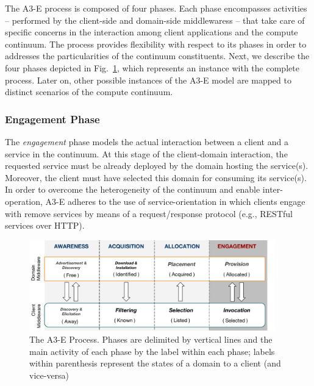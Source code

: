 The A3-E process is composed of four phases. Each phase encompasses activities -- performed by the client-side and domain-side middlewaress -- that take care of specific concerns in the interaction among client applications and the compute continuum. The process provides flexibility with respect to its phases in order to addresses the particularities of the continuum constituents. Next, we describe the four phases depicted in Fig.~\ref{fig:A3-E-process}, which represents an instance with the complete process. Later on, other possible instances of the A3-E model are mapped to distinct scenarios of the compute continuum.


\subsubsection*{Engagement Phase}\label{sec:A3-E-engagement}

The \textit{engagement} phase models the actual interaction between a client and a service in the continuum. At this stage of the client-domain interaction, the requested service must be already deployed by the domain hosting the service(s).  Moreover, the client must have selected this domain for consuming its service(s). In order to overcome the heterogeneity of the continuum and enable inter-operation, A3-E adheres to the use of service-orientation in which clients engage with remove services by means of a request/response protocol (e.g., RESTful services over HTTP).


\begin{figure}[tbp]
	\includegraphics[width=0.95\textwidth]{figs/A3-E-process}
	\caption{The A3-E Process. Phases are delimited by vertical lines and the main activity of each phase by the label within each phase; labels within parenthesis represent the states of a domain to a client (and vice-versa)}
	\label{fig:A3-E-process}
\end{figure}

